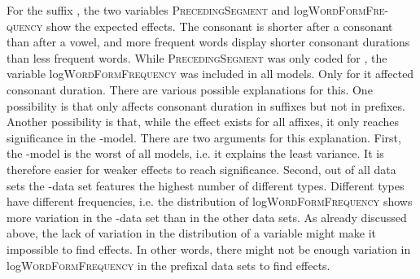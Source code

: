 For the suffix , the two variables \textsc{PrecedingSegment} and log\textsc{WordFormFre-quency} show the expected effects. The consonant is shorter after a consonant than after a vowel, and more frequent words display shorter consonant durations than less frequent words. While \textsc{PrecedingSegment} was only coded for , the variable log\textsc{WordFormFrequency} was included in all models. Only for  it affected consonant duration. There are various possible explanations for this. 
One possibility is that  only affects consonant duration in suffixes but not in prefixes. Another possibility is that, while the effect exists for all affixes, it only reaches significance in the -model. There are two arguments for this explanation.
 First, the -model is the worst of all models, i.e. it explains the least variance. It is therefore easier for weaker effects to reach significance. 
 Second, out of all data sets the -data set features the highest number of different types. Different types have different frequencies, i.e. the distribution of log\textsc{WordFormFrequency} shows more variation in the -data set than in the other data sets. As already discussed above, the lack of variation in the distribution of a variable might make it impossible to find effects. In other words, there might not be enough variation in log\textsc{WordFormFrequency} in the prefixal data sets to find effects.


